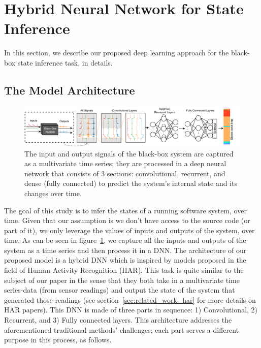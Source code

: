 \section{Hybrid Neural Network for State Inference} \label{sec:approach}
In this section, we describe our proposed deep learning approach for the black-box state inference task, in details. 

\subsection{The Model Architecture}
\begin{figure}
    \centering
    \includegraphics[width=\textwidth]{ASE_files/GeneralConvolutionalNet.pdf}
    \caption{The input and output signals of the black-box system are captured as a multivariate time series; they are processed in a deep neural network that consists of 3 sections: convolutional, recurrent, and dense (fully connected) to predict the system's internal state and its changes over time.}
    \label{fig:general_net}
\end{figure}

The goal of this study is to infer the states of a running software system, over time. Given that our assumption is we don't have access to the source code (or part of it), we only leverage the values of inputs and outputs of the system, over time. As can be seen in figure~\ref{fig:general_net}, we capture all the inputs and outputs of the system as a time series and then process it in a DNN. The architecture of our proposed model is a hybrid DNN which is inspired by models proposed in the field of Human Activity Recognition (HAR). This task is quite similar to the subject of our paper in the sense that they both take in a multivariate time series-data (from sensor readings) and output the state of the system that generated those readings (see section~\ref{sec:related_work_har} for more details on HAR papers). This DNN is made of three parts in sequence: 1) Convolutional, 2) Recurrent, and 3) Fully connected layers. This architecture addresses the aforementioned traditional methods' challenges; each part serves a different purpose in this process, as follows.


